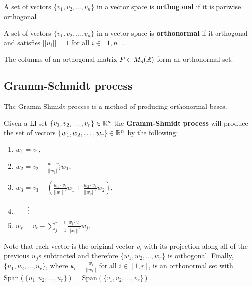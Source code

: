 \documentclass[../Year1/Year1.tex]{subfiles}
\begin{document}
\begin{definition}
    A set of vectors $\{v_1,v_2,\ldots,v_n\}$ in a vector space is \textbf{orthogonal} if it is pariwise orthogonal.
\end{definition}

\begin{definition}
    A set of vectors $\{v_1,v_2,\ldots,v_n\}$ in a vector space is \textbf{orthonormal} if it orthogonal and satisfies $||u_i||=1$ for all $i\in[1,n]$.
\end{definition}

\begin{theorem}
    The columns of an orthogonal matrix $P\in M_n(\mathbb{R})$ form an orthonormal set.
\end{theorem}

\subsection{Gramm-Schmidt process}
The Gramm-Shmidt process is a method of producing orthonormal bases.
\begin{algorithm}
    Given a LI set $\{v_1,v_2,\ldots,v_r\} \in \mathbb{R}^n$ the \textbf{Gramm-Shmidt process} will produce the set of vectors $\{w_1,w_2,\ldots,w_r\} \in \mathbb{R}^n$ by the following:
    \begin{samepage}
    \begin{enumerate}
        \item[] $\displaystyle w_1 = v_1$,
        \item[] $\displaystyle w_2 = v_2 - \frac{w_1\cdot v_2}{||w_1||^2}w_1$,
        \item[] $\displaystyle w_3 = v_3 - \left(\frac{w_1\cdot v_3}{||w_1||^2}w_1 + \frac{w_2\cdot v_3}{||w_2||^2}w_2\right)$,
        \item[] $\hspace{16.5pt}\vdots$
        \item[] $\displaystyle w_r = v_r - \sum_{j=1}^{r-1}\frac{w_j\cdot v_r}{||w_j||^2}w_j$.
    \end{enumerate}
    \end{samepage}
    Note that each vector is the original vector $v_i$ with its projection along all of the previous $w_j$s subtracted and therefore $\{w_1,w_2,\ldots,w_r\}$ is orthogonal. Finally, $\{u_1,u_2,\ldots,u_r\}$, where $\displaystyle u_i = \frac{w_i}{||w_i||}$ for all $i\in[1,r]$, is an orthonormal set with $\text{Span}(\{u_1,u_2,\ldots,u_r\}) = \text{Span}(\{v_1,v_2,\ldots,v_r\})$.
\end{algorithm}
\end{document}

